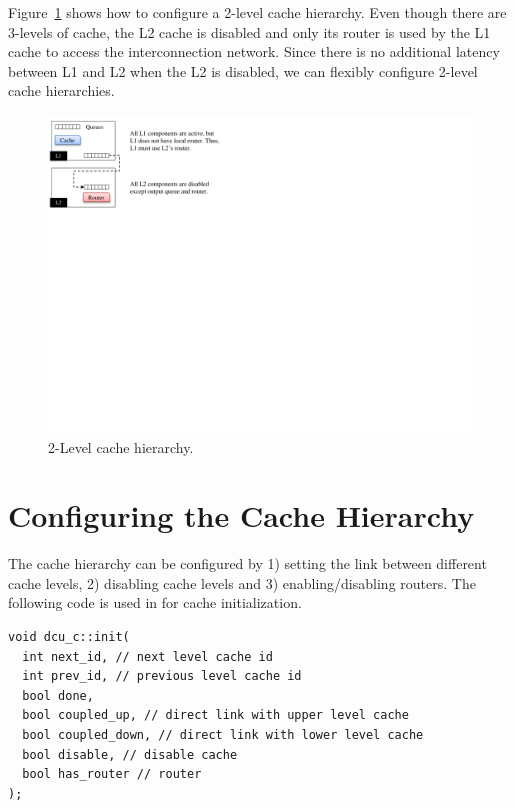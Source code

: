 Figure~\ref{fig:level2cache} shows how to configure a 2-level cache hierarchy.
Even though there are 3-levels of cache, the L2 cache is disabled and only its
router is used by the L1 cache to access the interconnection network. Since
there is no additional latency between L1 and L2 when the L2 is disabled, we
can flexibly configure 2-level cache hierarchies.


\begin{figure}[htb]
\centering
\includegraphics{figs/level2cache}
\caption{2-Level cache hierarchy.}
\label{fig:level2cache}
\end{figure}


\section{Configuring the Cache Hierarchy} 

The cache hierarchy can be configured by 1) setting the link between different
cache levels, 2) disabling cache levels and 3) enabling/disabling routers. The
following code is used in \SIM for cache initialization.

\begin{Verbatim}
void dcu_c::init(
  int next_id, // next level cache id
  int prev_id, // previous level cache id
  bool done, 
  bool coupled_up, // direct link with upper level cache
  bool coupled_down, // direct link with lower level cache
  bool disable, // disable cache
  bool has_router // router
);
\end{Verbatim}

